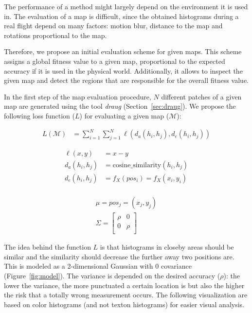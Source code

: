The performance of a method might largely depend
on the environment it is used in. The evaluation of a map is
difficult, since the obtained histograms during a real flight depend
on many factors: motion blur, distance to the map and rotations
proportional to the map.

Therefore, we propose an initial evaluation scheme for given
maps. This scheme assigns a global fitness value to a given map,
proportional to the expected accuracy if it is used in the physical
world. Additionally, it allows to inspect the given map and detect the
regions that are responsible for the overall fitness value.

In the first step of the map evaluation procedure, $N$ different
patches of a given map are generated using the tool \emph{draug}
(Section~\ref{sec:draug}). We propose the following loss function
($L$) for evaluating a given map ($\mathcal{M}$):

\begin{align}
  L(\mathcal{M}) &= \sum_{i = 1}^{N} \sum_{j = 1}^{N} \ell(d_a(h_i, h_j), d_e(h_i, h_j))
\end{align}

\begin{align}
  \ell(x, y) &= x - y\\
  d_a(h_i, h_j) &= \text{cosine\_similarity}(h_i, h_j)\\
  d_e(h_i, h_j) &= f_X(pos_i) = f_X(x_i, y_i)\\
\end{align}

\begin{align}
\mu = pos_j = (x_j, y_j)\\
\Sigma =
  \begin{bmatrix}
    \rho & 0\\
    0 & \rho\\
  \end{bmatrix}
\end{align}

The idea behind the function $L$ is that histograms in closeby areas
should be similar and the similarity should decrease the further away
two positions are. This is modeled as a 2-dimensional Gaussian with 0
covariance (Figure~\ref{fig:model}). The variance is depended on the
desired accuracy ($\rho$): the lower the variance, the more punctuated
a certain location is but also the higher the risk that a totally
wrong measurement occurs. The following visualization are based on
color histograms (and not texton histograms) for easier visual
analysis.

